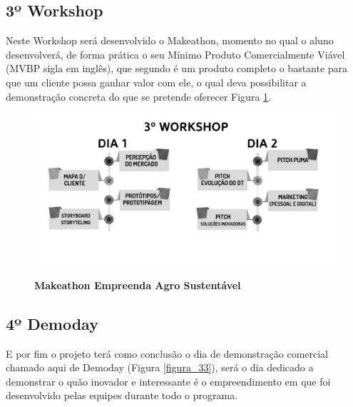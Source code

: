 \subsection{3º Workshop}
 
Neste Workshop será desenvolvido o Makeathon, momento no qual o aluno desenvolverá, de forma prática o seu Mínimo Produto Comercialmente Viável (MVBP sigla em inglês), que segundo  é um produto completo o bastante para que um cliente possa ganhar valor com ele, o qual deva possibilitar a demonstração concreta do que se pretende oferecer Figura \ref{figura_32}. 


\begin{figure}[h!]
\centering
\caption{\textbf{Makeathon Empreenda Agro Sustentável}}
\includegraphics[scale=0.4]{Imagens/workshop-03.png}
\label{figura_32}
\end{figure}



\subsection{4º Demoday}

E por fim o projeto terá como conclusão o dia de demonstração comercial chamado aqui de Demoday (Figura \ref{figura_33}), será o dia dedicado a demonstrar o quão inovador e interessante é o empreendimento em que foi desenvolvido pelas equipes durante todo o programa.



